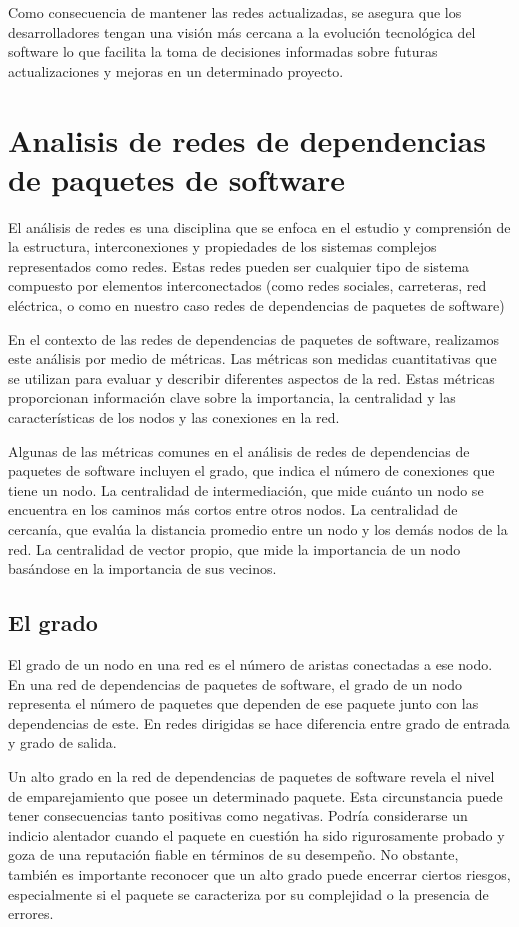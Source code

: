 Como consecuencia de  mantener las redes actualizadas, se asegura que los desarrolladores tengan una visión más cercana a la evolución tecnológica del software lo que facilita la toma de decisiones informadas sobre futuras actualizaciones y mejoras en un determinado proyecto.

\section{Analisis de redes de dependencias de paquetes de software}

El análisis de redes es una disciplina que se enfoca en el estudio y comprensión de la estructura, interconexiones y propiedades de los sistemas complejos representados como redes. Estas redes pueden ser cualquier tipo de sistema compuesto por elementos interconectados (como redes sociales, carreteras, red eléctrica, o como en nuestro caso redes de dependencias de paquetes de software)

En el contexto de las redes de dependencias de paquetes de software, realizamos este análisis por medio de métricas. Las métricas son medidas cuantitativas que se utilizan para evaluar y describir diferentes aspectos de la red. Estas métricas proporcionan información clave sobre la importancia, la centralidad y las características de los nodos y las conexiones en la red.

Algunas de las métricas comunes en el análisis de redes de dependencias de paquetes de software incluyen el grado, que indica el número de conexiones que tiene un nodo. La centralidad de intermediación, que mide cuánto un nodo se encuentra en los caminos más cortos entre otros nodos. La centralidad de cercanía, que evalúa la distancia promedio entre un nodo y los demás nodos de la red. La centralidad de vector propio, que mide la importancia de un nodo basándose en la importancia de sus vecinos.

\subsection{El grado}

El grado de un nodo en una red es el número de aristas conectadas a ese nodo. 
En una red de dependencias de paquetes de software, el grado de un nodo representa el número de paquetes que dependen de ese paquete junto con las dependencias de este.
En redes dirigidas se hace diferencia entre grado de entrada y grado de salida.

Un alto grado en la red de dependencias de paquetes de software revela el nivel de emparejamiento que posee un determinado paquete. Esta circunstancia puede tener consecuencias tanto positivas como negativas.
Podría considerarse un indicio alentador cuando el paquete en cuestión ha sido rigurosamente probado y goza de una reputación fiable en términos de su desempeño. No obstante, también es importante reconocer que un alto grado puede encerrar ciertos riesgos, especialmente si el paquete se caracteriza por su complejidad o la presencia de errores.


